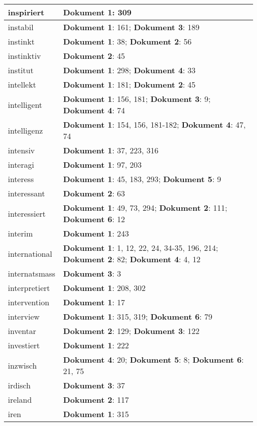\documentclass[a5paper]{article}
\begin{document}
\begin{longtable}[l]{|l|p{3in}|}
\hline
inspiriert & \textbf{Dokument 1}: 309 \\
\hline
instabil & \textbf{Dokument 1}: 161; \textbf{Dokument 3}: 189 \\
\hline
instinkt & \textbf{Dokument 1}: 38; \textbf{Dokument 2}: 56 \\
\hline
instinktiv & \textbf{Dokument 2}: 45 \\
\hline
institut & \textbf{Dokument 1}: 298; \textbf{Dokument 4}: 33 \\
\hline
intellekt & \textbf{Dokument 1}: 181; \textbf{Dokument 2}: 45 \\
\hline
intelligent & \textbf{Dokument 1}: 156, 181; \textbf{Dokument 3}: 9; \textbf{Dokument 4}: 74 \\
\hline
intelligenz & \textbf{Dokument 1}: 154, 156, 181-182; \textbf{Dokument 4}: 47, 74 \\
\hline
intensiv & \textbf{Dokument 1}: 37, 223, 316 \\
\hline
interagi & \textbf{Dokument 1}: 97, 203 \\
\hline
interess & \textbf{Dokument 1}: 45, 183, 293; \textbf{Dokument 5}: 9 \\
\hline
interessant & \textbf{Dokument 2}: 63 \\
\hline
interessiert & \textbf{Dokument 1}: 49, 73, 294; \textbf{Dokument 2}: 111; \textbf{Dokument 6}: 12 \\
\hline
interim & \textbf{Dokument 1}: 243 \\
\hline
international & \textbf{Dokument 1}: 1, 12, 22, 24, 34-35, 196, 214; \textbf{Dokument 2}: 82; \textbf{Dokument 4}: 4, 12 \\
\hline
internatsmass & \textbf{Dokument 3}: 3 \\
\hline
interpretiert & \textbf{Dokument 1}: 208, 302 \\
\hline
intervention & \textbf{Dokument 1}: 17 \\
\hline
interview & \textbf{Dokument 1}: 315, 319; \textbf{Dokument 6}: 79 \\
\hline
inventar & \textbf{Dokument 2}: 129; \textbf{Dokument 3}: 122 \\
\hline
investiert & \textbf{Dokument 1}: 222 \\
\hline
inzwisch & \textbf{Dokument 4}: 20; \textbf{Dokument 5}: 8; \textbf{Dokument 6}: 21, 75 \\
\hline
irdisch & \textbf{Dokument 3}: 37 \\
\hline
ireland & \textbf{Dokument 2}: 117 \\
\hline
iren & \textbf{Dokument 1}: 315 \\

\end{longtable}
\end{document}
